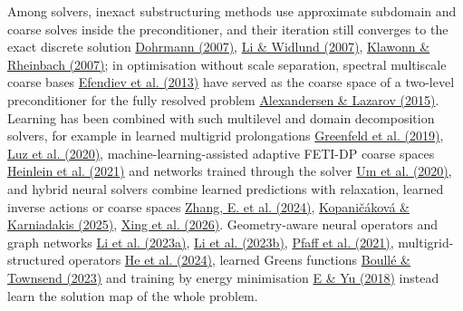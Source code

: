 \documentclass[preprint,12pt,authoryear]{elsarticle}
\begin{document}
Among solvers, inexact substructuring methods use approximate subdomain and coarse solves inside the preconditioner, and their iteration still converges to the exact discrete solution \href{https://doi.org/10.1002/nla.514}{Dohrmann (2007)}, \href{https://doi.org/10.1016/j.cma.2006.03.011}{Li \& Widlund (2007)}, \href{https://doi.org/10.1002/nme.1758}{Klawonn \& Rheinbach (2007)}; in optimisation without scale separation, spectral multiscale coarse bases \href{https://doi.org/10.1016/j.jcp.2013.04.045}{Efendiev et al. (2013)} have served as the coarse space of a two-level preconditioner for the fully resolved problem \href{https://doi.org/10.1016/j.cma.2015.02.028}{Alexandersen \& Lazarov (2015)}. Learning has been combined with such multilevel and domain decomposition solvers, for example in learned multigrid prolongations \href{https://proceedings.mlr.press/v97/greenfeld19a.html}{Greenfeld et al. (2019)}, \href{https://proceedings.mlr.press/v119/luz20a.html}{Luz et al. (2020)}, machine-learning-assisted adaptive FETI-DP coarse spaces \href{https://doi.org/10.1137/20M1344913}{Heinlein et al. (2021)} and networks trained through the solver \href{https://proceedings.neurips.cc/paper/2020/hash/43e4e6a6f341e00671e123714de019a8-Abstract.html}{Um et al. (2020)}, and hybrid neural solvers combine learned predictions with relaxation, learned inverse actions or coarse spaces \href{https://doi.org/10.1038/s42256-024-00910-x}{Zhang, E. et al. (2024)}, \href{https://doi.org/10.1137/24m162861x}{Kopaničáková \& Karniadakis (2025)}, \href{https://doi.org/10.1145/3811333}{Xing et al. (2026)}. Geometry-aware neural operators and graph networks \href{https://www.jmlr.org/papers/v24/23-0064.html}{Li et al. (2023a)}, \href{https://doi.org/10.52202/075280-1556}{Li et al. (2023b)}, \href{https://openreview.net/forum?id=roNqYL0_XP}{Pfaff et al. (2021)}, multigrid-structured operators \href{https://proceedings.iclr.cc/paper_files/paper/2024/hash/eb3c8135137c8a60425a0320869ad87e-Abstract-Conference.html}{He et al. (2024)}, learned Green\textquotesingle s functions \href{https://doi.org/10.1007/s10208-022-09556-w}{Boullé \& Townsend (2023)} and training by energy minimisation \href{https://doi.org/10.1007/s40304-018-0127-z}{E \& Yu (2018)} instead learn the solution map of the whole problem.
\end{document}
